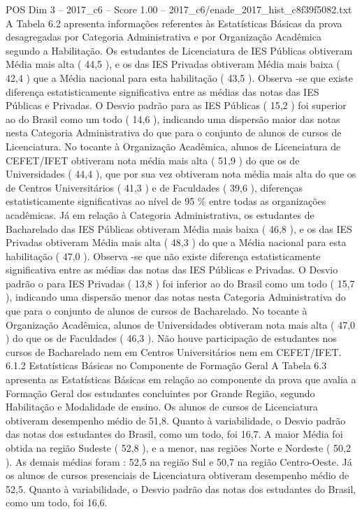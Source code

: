 \begin{textsample}{POS Dim 3 – 2017\_c6 – Score 1.00 – 2017\_c6/enade\_2017\_hist\_c8f39f5082.txt}
A Tabela 6.2 apresenta informações referentes às Estatísticas Básicas da prova desagregadas por Categoria Administrativa e por Organização Acadêmica segundo a Habilitação.
Os estudantes de Licenciatura de IES Públicas obtiveram Média mais alta ( 44,5 ), e os das IES Privadas obtiveram Média mais baixa ( 42,4 ) que a Média nacional para esta habilitação ( 43,5 ).
Observa -se que existe diferença estatisticamente significativa entre as médias das notas das IES Públicas e Privadas.
O Desvio padrão para as IES Públicas ( 15,2 ) foi superior ao do Brasil como um todo ( 14,6 ), indicando uma dispersão maior das notas nesta Categoria Administrativa do que para o conjunto de alunos de cursos de Licenciatura.
No tocante à Organização Acadêmica, alunos de Licenciatura de CEFET/IFET obtiveram nota média mais alta ( 51,9 ) do que os de Universidades ( 44,4 ), que por sua vez obtiveram nota média mais alta do que os de Centros Universitários ( 41,3 ) e de Faculdades ( 39,6 ), diferenças estatisticamente significativas ao nível de 95 \% entre todas as organizações acadêmicas.
Já em relação à Categoria Administrativa, os estudantes de Bacharelado das IES Públicas obtiveram Média mais baixa ( 46,8 ), e os das IES Privadas obtiveram Média mais alta ( 48,3 ) do que a Média nacional para esta habilitação ( 47,0 ).
Observa -se que não existe diferença estatisticamente significativa entre as médias das notas das IES Públicas e Privadas.
O Desvio padrão o para IES Privadas ( 13,8 ) foi inferior ao do Brasil como um todo ( 15,7 ), indicando uma dispersão menor das notas nesta Categoria Administrativa do que para o conjunto de alunos de cursos de Bacharelado.
No tocante à Organização Acadêmica, alunos de Universidades obtiveram nota mais alta ( 47,0 ) do que os de Faculdades ( 46,3 ).
Não houve participação de estudantes nos cursos de Bacharelado nem em Centros Universitários nem em CEFET/IFET. 6.1.2 Estatísticas Básicas no Componente de Formação Geral A Tabela 6.3 apresenta as Estatísticas Básicas em relação ao componente da prova que avalia a Formação Geral dos estudantes concluintes por Grande Região, segundo Habilitação e Modalidade de ensino.
Os alunos de cursos de Licenciatura obtiveram desempenho médio de 51,8.
Quanto à variabilidade, o Desvio padrão das notas dos estudantes do Brasil, como um todo, foi 16,7.
A maior Média foi obtida na região Sudeste ( 52,8 ), e a menor, nas regiões Norte e Nordeste ( 50,2 ).
As demais médias foram : 52,5 na região Sul e 50,7 na região Centro-Oeste.
Já os alunos de cursos presenciais de Licenciatura obtiveram desempenho médio de 52,5.
Quanto à variabilidade, o Desvio padrão das notas dos estudantes do Brasil, como um todo, foi 16,6.

\end{textsample}

